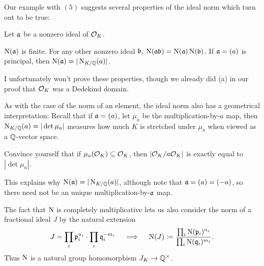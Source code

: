 Our example with $(5)$ suggests several properties of the ideal norm
which turn out to be true:
\begin{lemma}
	Let $\mathfrak a$ be a nonzero ideal of $\mathcal O_K$.
	\begin{enumerate}[(a)]
		\ii $\operatorname{N}(\mathfrak a)$ is finite.
		\ii For any other nonzero ideal $\mathfrak b$, $\operatorname{N}(\mathfrak a\mathfrak b) = \operatorname{N}(\mathfrak a)\operatorname{N}(\mathfrak b)$.
		\ii If $\mathfrak a = (a)$ is principal, then $\operatorname{N}(\mathfrak a) = |\operatorname{N}_{K/\mathbb Q}(a)|$.
	\end{enumerate}
\end{lemma}
I unfortunately won't prove these properties, though we already did (a) in our proof that $\mathcal O_K$
was a Dedekind domain.


As with the case of the norm of an element, the ideal norm also has a geometrical interpretation:
Recall that if $\mathfrak a = (a)$, let $\mu_a$ be the multiplication-by-$a$ map,
then $\operatorname{N}_{K/\mathbb Q}(a) = |\det \mu_a|$ measures how much $K$ is stretched under $\mu_a$ when viewed
as a $\mathbb Q$-vector space.
\begin{exercise}
	Convince yourself that if $\mu_a(\mathcal O_K) \subseteq \mathcal O_K$, then $|\mathcal O_K / a \mathcal O_K|$ is
	exactly equal to $|\det \mu_a|$.
\end{exercise}
This explains why $\operatorname{N}(\mathfrak a) = |\operatorname{N}_{K/\mathbb Q}(a)|$, although note that $\mathfrak a = (a) = (-a)$, so there
need not be an unique multiplication-by-$\mathfrak a$ map.

The fact that $\operatorname{N}$ is completely multiplicative lets us also consider the norm
of a fractional ideal $J$ by the natural extension
\[ J = \prod_i \mathfrak p_i^{n_i} \cdot \prod_i \mathfrak q_i^{-m_i}
	\quad \implies \quad
	\operatorname{N}(J) \coloneqq \frac{\prod_i \operatorname{N}(\mathfrak p_i)^{n_i}}{\prod_i \operatorname{N}(\mathfrak q_i)^{m_i}}. \]
Thus $\operatorname{N}$ is a natural group homomorphism $J_K \to \mathbb Q^\times$.


